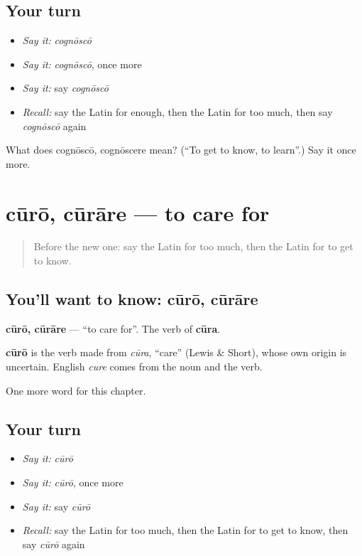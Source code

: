 \subsection*{Your turn}
\begin{itemize}
\raggedright
  \item \emph{Say it:} \emph{cognōscō}
  \item \emph{Say it:} \emph{cognōscō}, once more
  \item \emph{Say it:} say \emph{cognōscō}
  \item \emph{Recall:} say the Latin for enough, then the Latin for too much, then say \emph{cognōscō} again
\end{itemize}

\begin{tcolorbox}[breakable,colback=teal!4,colframe=teal!35!black,title={Before you move on}]
What does cognōscō, cognōscere mean? (\textquotedblleft{}To get to know, to learn\textquotedblright{}.) Say it once more.
\end{tcolorbox}
\section[cūrō, cūrāre]{cūrō, cūrāre — to care for}

\label{lesson:LA-C99-curo}



\begin{quote}
Before the new one: say the Latin for too much, then the Latin for to get to know.
\end{quote}

\subsection*{You'll want to know: cūrō, cūrāre}
\textbf{cūrō, cūrāre} — \textquotedblleft{}to care for\textquotedblright{}. The verb of \textbf{cūra}.

\begin{cousinweb}
\textbf{cūrō} is the verb made from \emph{cūra}, \textquotedblleft{}care\textquotedblright{} (Lewis \& Short), whose own origin is uncertain. English \emph{cure} comes from the noun and the verb.
\end{cousinweb}

\begin{grammarlens}[title={What you've built}]
One more word for this chapter.
\end{grammarlens}

\subsection*{Your turn}
\begin{itemize}
\raggedright
  \item \emph{Say it:} \emph{cūrō}
  \item \emph{Say it:} \emph{cūrō}, once more
  \item \emph{Say it:} say \emph{cūrō}
  \item \emph{Recall:} say the Latin for too much, then the Latin for to get to know, then say \emph{cūrō} again
\end{itemize}

